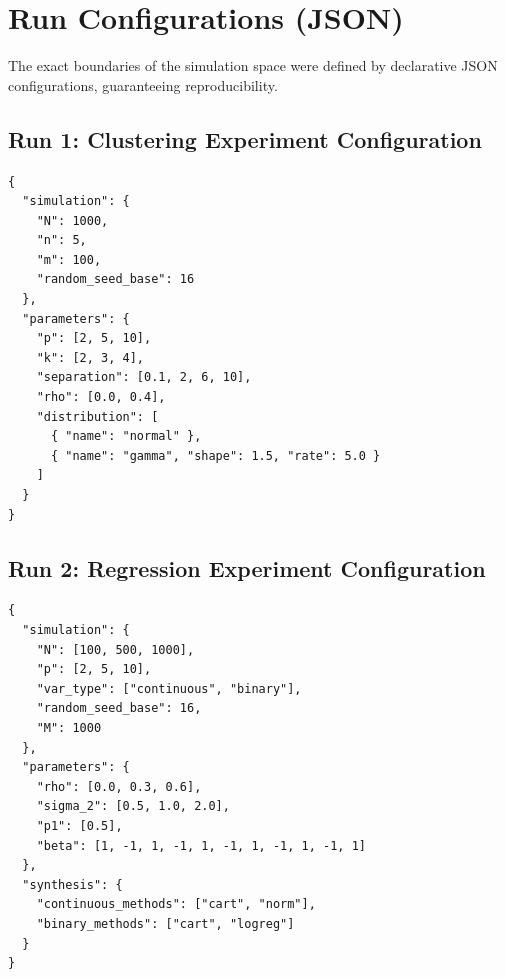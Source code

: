 \section{Run Configurations (JSON)}
\label{sec:app-json}

The exact boundaries of the simulation space were defined by declarative JSON configurations, guaranteeing reproducibility.

\subsection{Run 1: Clustering Experiment Configuration}
\begin{verbatim}
{
  "simulation": {
    "N": 1000,
    "n": 5,
    "m": 100,
    "random_seed_base": 16
  },
  "parameters": {
    "p": [2, 5, 10],
    "k": [2, 3, 4],
    "separation": [0.1, 2, 6, 10],
    "rho": [0.0, 0.4],
    "distribution": [
      { "name": "normal" },
      { "name": "gamma", "shape": 1.5, "rate": 5.0 }
    ]
  }
}
\end{verbatim}

\subsection{Run 2: Regression Experiment Configuration}
\begin{verbatim}
{
  "simulation": {
    "N": [100, 500, 1000],
    "p": [2, 5, 10],
    "var_type": ["continuous", "binary"],
    "random_seed_base": 16,
    "M": 1000
  },
  "parameters": {
    "rho": [0.0, 0.3, 0.6],
    "sigma_2": [0.5, 1.0, 2.0],
    "p1": [0.5],
    "beta": [1, -1, 1, -1, 1, -1, 1, -1, 1, -1, 1]
  },
  "synthesis": {
    "continuous_methods": ["cart", "norm"],
    "binary_methods": ["cart", "logreg"]
  }
}
\end{verbatim}
